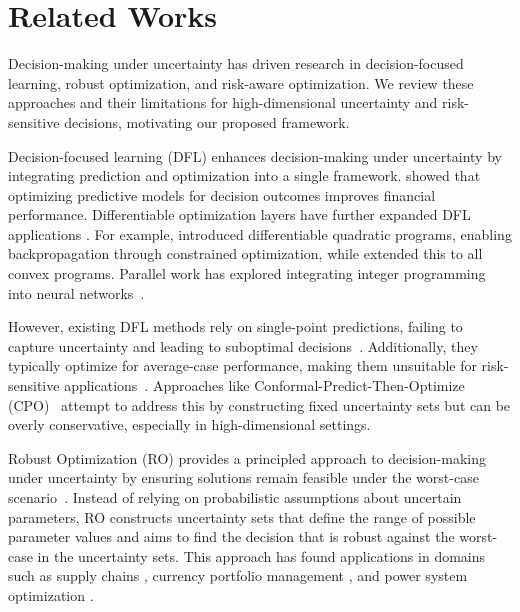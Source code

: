 \section{Related Works}
Decision-making under uncertainty has driven research in decision-focused learning, robust optimization, and risk-aware optimization. We review these approaches and their limitations for high-dimensional uncertainty and risk-sensitive decisions, motivating our proposed framework.

Decision-focused learning (DFL) enhances decision-making under uncertainty by integrating prediction and optimization into a single framework. \citet{bengio1997using} showed that optimizing predictive models for decision outcomes improves financial performance. 
Differentiable optimization layers have further expanded DFL applications \cite{agrawal2019differentiable}. For example, \citet{pmlr-v70-amos17a} introduced differentiable quadratic programs, enabling backpropagation through constrained optimization, while \citet{agrawal2019differentiable} extended this to all convex programs. Parallel work has explored integrating integer programming into neural networks~\cite{NEURIPS2020_51311013,wilder2019melding}.

However, existing DFL methods rely on single-point predictions, failing to capture uncertainty and leading to suboptimal decisions~\cite{koppen2000curse,ben2009robust}. Additionally, they typically optimize for average-case performance, making them unsuitable for risk-sensitive applications~\cite{Mandi_2024}. Approaches like Conformal-Predict-Then-Optimize (CPO)~\cite{patel2024conformal} attempt to address this by constructing fixed uncertainty sets but can be overly conservative, especially in high-dimensional settings.

Robust Optimization (RO) provides a principled approach to decision-making under uncertainty by ensuring solutions remain feasible under the worst-case scenario~\cite{ben2002robust,bertsimas2004robust,ben2006extending}. Instead of relying on probabilistic assumptions about uncertain parameters, RO constructs uncertainty sets that define the range of possible parameter values \cite{bertsimas2011theory} and aims to find the decision that is robust against the worst-case in the uncertainty sets. This approach has found applications in domains such as supply chains \cite{bertsimas2004robust}, currency portfolio management \cite{fonseca2011robust}, and power system optimization \cite{10384836}. 

